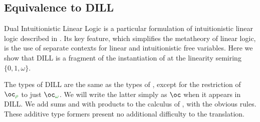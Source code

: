 \subsection{Equivalence to DILL}
\label{sec:dill}



Dual Intuitionistic Linear Logic is a particular formulation of intuitionistic
linear logic described in \cite{Barber1996}.
Its key feature, which simplifies the metatheory of linear logic, is the use of
separate contexts for linear and intuitionistic free variables.
Here we show that DILL is a fragment of the instantiation of \name{} at the
linearity semiring $\{0,1,\omega\}$.

The types of DILL are the same as the types of \name, except for the
restriction of $\excl{\rho}{}$ to just $\excl{\omega}{}$.
We will write the latter simply as $\oc$ when it appears in DILL.
We add sums and with products to the calculus of \cite{Barber1996}, with the
obvious rules.
These additive type formers present no additional difficulty to the translation.



